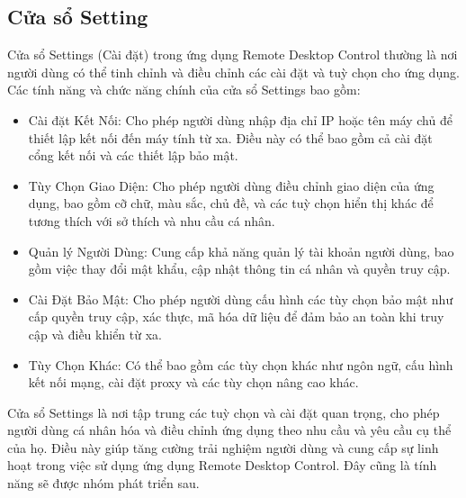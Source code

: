\subsection{Cửa sổ Setting}
Cửa sổ Settings (Cài đặt) trong ứng dụng Remote Desktop Control thường là nơi người dùng có thể tinh chỉnh và điều chỉnh các cài đặt và tuỳ chọn cho ứng dụng. Các tính năng và chức năng chính của cửa sổ Settings bao gồm:
\begin{itemize}
	\item Cài đặt Kết Nối: Cho phép người dùng nhập địa chỉ IP hoặc tên máy chủ để thiết lập kết nối đến máy tính từ xa. Điều này có thể bao gồm cả cài đặt cổng kết nối và các thiết lập bảo mật.
	
	\item Tùy Chọn Giao Diện: Cho phép người dùng điều chỉnh giao diện của ứng dụng, bao gồm cỡ chữ, màu sắc, chủ đề, và các tuỳ chọn hiển thị khác để tương thích với sở thích và nhu cầu cá nhân.
	
	\item Quản lý Người Dùng: Cung cấp khả năng quản lý tài khoản người dùng, bao gồm việc thay đổi mật khẩu, cập nhật thông tin cá nhân và quyền truy cập.
	
	\item Cài Đặt Bảo Mật: Cho phép người dùng cấu hình các tùy chọn bảo mật như cấp quyền truy cập, xác thực, mã hóa dữ liệu để đảm bảo an toàn khi truy cập và điều khiển từ xa.
	
	\item Tùy Chọn Khác: Có thể bao gồm các tùy chọn khác như ngôn ngữ, cấu hình kết nối mạng, cài đặt proxy và các tùy chọn nâng cao khác.	
\end{itemize}
Cửa sổ Settings là nơi tập trung các tuỳ chọn và cài đặt quan trọng, cho phép người dùng cá nhân hóa và điều chỉnh ứng dụng theo nhu cầu và yêu cầu cụ thể của họ. Điều này giúp tăng cường trải nghiệm người dùng và cung cấp sự linh hoạt trong việc sử dụng ứng dụng Remote Desktop Control. Đây cũng là tính năng sẽ được nhóm phát triển sau.







